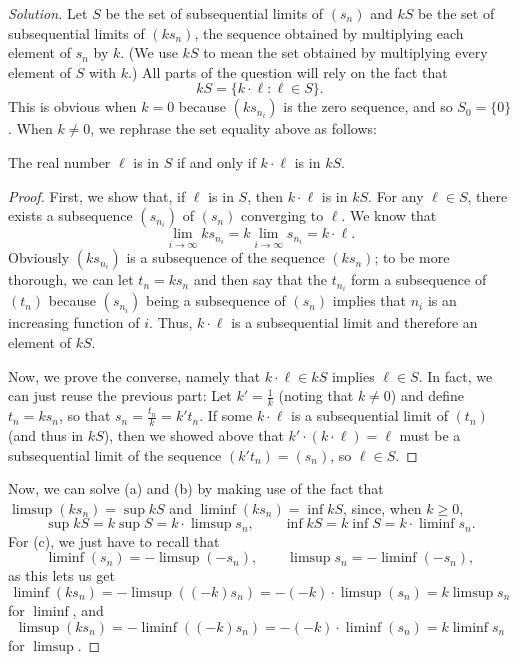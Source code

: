 \documentclass[11pt]{scrartcl}
\theoremstyle{problem}
\theoremstyle{remark}
\newenvironment{soln}{\begin{proof}[Solution]}{\end{proof}}
\begin{document}
\begin{soln}
	Let $S$ be the set of subsequential limits of $(s_n)$
	and $kS$ be the set of subsequential limits of $(ks_n)$,
	the sequence obtained by multiplying each element of $s_n$ by $k$.
	(We use $kS$ to mean the set obtained by
	multiplying every element of $S$ with $k$.)
	All parts of the question will rely on the fact that
	\[kS = \{k\cdot\ell : \ell\in S\}.\]
	This is obvious when $k = 0$ because $(ks_{n_i})$ is the zero sequence,
	and so $S_0 = \{0\}$.
	When $k \ne 0$, we rephrase the set equality above as follows:
	\begin{claim*}
		The real number $\ell$ is in $S$ if and only if
		$k\cdot\ell$ is in $kS$.
	\end{claim*}
	\begin{proof}
		First, we show that, if $\ell$ is in $S$, then
		$k\cdot\ell$ is in $kS$.
		For any $\ell\in S$, there exists
		a subsequence $(s_{n_i})$ of $(s_n)$ converging to $\ell$.
		We know that
		\[\lim_{i\to\infty} ks_{n_i} = k\lim_{i\to\infty} s_{n_i}
		= k\cdot\ell.\]
		Obviously $(ks_{n_i})$ is a subsequence of the sequence $(ks_n)$;
		to be more thorough, we can let $t_n = ks_n$ and then say that
		the $t_{n_i}$ form a subsequence of $(t_n)$ because
		$(s_{n_i})$ being a subsequence of $(s_n)$
		implies that $n_i$ is an increasing function of $i$.
		Thus, $k\cdot\ell$ is a subsequential limit
		and therefore an element of $kS$.
		
		Now, we prove the converse, namely that
		$k\cdot\ell \in kS$ implies $\ell\in S$.
		In fact, we can just reuse the previous part:
		Let $k' = \frac1k$ (noting that $k\ne 0$)
		and define $t_n = ks_n$, so that $s_n = \frac{t_n}k = k't_n$.
		If some $k\cdot\ell$ is a subsequential limit of $(t_n)$
		(and thus in $kS$),
		then we showed above that $k'\cdot (k\cdot\ell) = \ell$
		must be a subsequential limit of the sequence $(k't_n) = (s_n)$,
		so $\ell\in S$.
	\end{proof}

	Now, we can solve (a) and (b) by making use of the fact that
	$\limsup(ks_n) = \sup kS$ and $\liminf(ks_n) = \inf kS$, since,
	when $k\ge 0$,
	\[\sup kS = k\sup S = k\cdot\limsup s_n,\qquad
	\inf kS = k\inf S = k\cdot\liminf s_n.\]
	For (c), we just have to recall that
	\[\liminf(s_n) = -\limsup(-s_n),\qquad \limsup s_n = -\liminf(-s_n),\]
	as this lets us get
	\[\liminf(ks_n) = -\limsup((-k)s_n) = -(-k)\cdot \limsup(s_n)
	= k\limsup s_n\]
	for $\liminf$, and
	\[\limsup(ks_n) = -\liminf((-k)s_n) = -(-k)\cdot \liminf(s_n)
	= k\liminf s_n\]
	for $\limsup$.
\end{soln}
\end{document}
